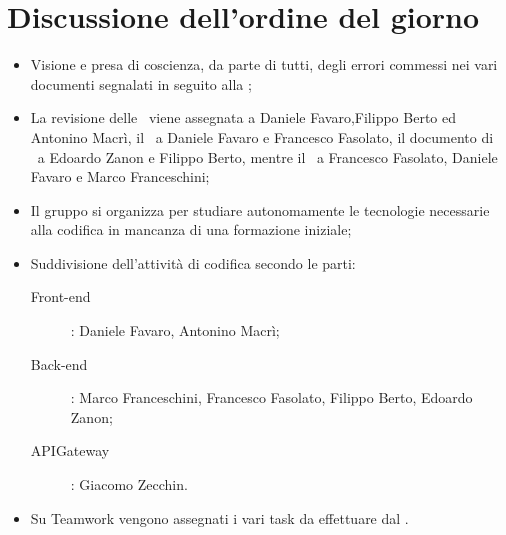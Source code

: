 \documentclass[../verbale-2017-03-14.tex]{subfiles}
\begin{document}
	\section{Discussione dell'ordine del giorno}
	\begin{itemize}
		\item Visione e presa di coscienza, da parte di tutti, degli errori commessi nei vari documenti segnalati in seguito alla \revisionediprogettazione;
		\item La revisione delle \normediprogettoRP\ viene assegnata a Daniele Favaro,Filippo Berto ed Antonino Macrì, il \pianodiqualificaRP\ a Daniele Favaro e Francesco Fasolato, il documento di \ a Edoardo Zanon e Filippo Berto, mentre il \pianodiprogettoRP\ a Francesco Fasolato, Daniele Favaro e Marco Franceschini;
		\item Il gruppo si organizza per studiare autonomamente le tecnologie necessarie alla codifica in mancanza di una formazione iniziale;
		\item Suddivisione dell'attività di codifica secondo le parti:
			\begin{description}
				\item [Front-end]: Daniele Favaro, Antonino Macrì;
				\item [Back-end]: Marco Franceschini, Francesco Fasolato, Filippo Berto, Edoardo Zanon;
				\item [APIGateway]: Giacomo Zecchin.
			\end{description}
		\item Su Teamwork vengono assegnati i vari task da effettuare dal \responsabilediprogetto.
	\end{itemize}
\end{document}

